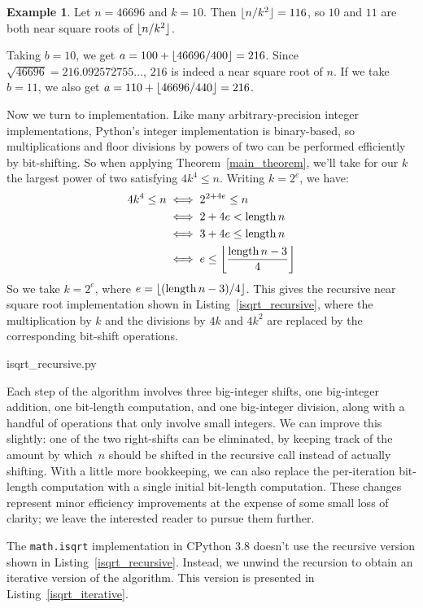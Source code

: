 \documentclass[a4paper]{article}
\DeclarePairedDelimiter\floor{\lfloor}{\rfloor}
\DeclareMathOperator{\length}{length}
\theoremstyle{plain}
\theoremstyle{definition}
\newtheorem{example}[theorem]{Example}
\begin{document}
\begin{example}
  Let $n = 46696$ and $k=10$. Then $\floor{n / k^2} = 116$, so $10$ and
  $11$ are both near square roots of $\floor{n / k^2}$.

  Taking $b = 10$, we get $a = 100 + \floor{46696 / 400} = 216$. Since
  $\sqrt{46696} = 216.092572755\dots$, $216$ is indeed a near square root of
  $n$. If we take $b = 11$, we also get $a = 110 + \floor{46696 / 440} = 216$.
\end{example}

Now we turn to implementation. Like many arbitrary-precision integer
implementations, Python's integer implementation is binary-based, so
multiplications and floor divisions by powers of two can be performed
efficiently by bit-shifting. So when applying Theorem~\ref{main_theorem}, we'll
take for our $k$ the largest power of two satisfying $4k^4 \le n$. Writing
$k=2^e$, we have:
\begin{align*}
  4k^4 \le n
  &\iff 2^{2 + 4e} \le n \\
  &\iff 2 + 4e < \length n \\
  &\iff 3 + 4e \le \length n \\
  &\iff e \le \floor*{\frac{\length n - 3}{4}}
\end{align*}
So we take $k = 2^e$, where $e={\floor{(\length n - 3)/4}}$. This gives the
recursive near square root implementation shown in
Listing~\ref{isqrt_recursive}, where the multiplication by $k$ and the
divisions by $4k$ and $4k^2$ are replaced by the corresponding bit-shift
operations.


  {isqrt_recursive.py}

Each step of the algorithm involves three big-integer shifts, one
big-integer addition, one bit-length computation, and one big-integer division,
along with a handful of operations that only involve small integers.
We can improve this slightly: one of the two right-shifts can be eliminated, by
keeping track of the amount by which~$n$ should be shifted in the recursive
call instead of actually shifting. With a little more bookkeeping, we can
also replace the per-iteration bit-length computation with a single
initial bit-length computation. These changes represent minor efficiency
improvements at the expense of some small loss of clarity; we leave the
interested reader to pursue them further.

The \lstinline{math.isqrt} implementation in CPython 3.8 doesn't use the
recursive version shown in Listing~\ref{isqrt_recursive}. Instead, we unwind
the recursion to obtain an iterative version of the algorithm. This version is
presented in Listing~\ref{isqrt_iterative}.
\end{document}
